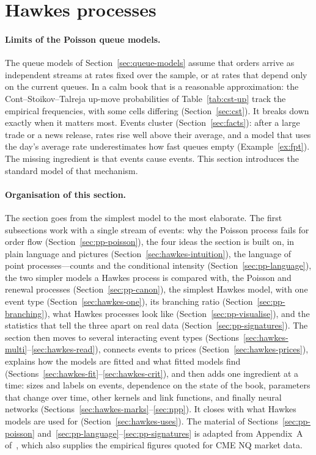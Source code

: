 \section{Hawkes processes}
\label{sec:hawkes}

\paragraph{Limits of the Poisson queue models.} The queue models of Section~\ref{sec:queue-models} assume
that orders arrive as independent streams at rates fixed over the sample, or at rates that depend only
on the current queues. In a calm book that is a
reasonable approximation: the Cont--Stoikov--Talreja up-move probabilities of Table~\ref{tab:cst-up}
track the empirical frequencies, with some cells differing (Section~\ref{sec:cst}). It breaks down
exactly when it matters most. Events cluster (Section~\ref{sec:facts}): after a large trade or a news
release, rates rise well above their average, and a model
that uses the day's average rate underestimates how fast queues empty (Example~\ref{ex:fpt}). The
missing ingredient is that events cause events. This section introduces the standard model of that
mechanism.

\paragraph{Organisation of this section.} The section goes from the simplest model to the most
elaborate. The first subsections work with a single stream of events: why the Poisson process fails
for order flow (Section~\ref{sec:pp-poisson}), the four ideas the section is built on, in plain language and
pictures (Section~\ref{sec:hawkes-intuition}), the language of point processes---counts and the conditional
intensity (Section~\ref{sec:pp-language}), the two simpler models a Hawkes process is compared with, the
Poisson and renewal processes (Section~\ref{sec:pp-canon}), the simplest Hawkes model, with one event type
(Section~\ref{sec:hawkes-one}), its branching ratio (Section~\ref{sec:pp-branching}), what Hawkes processes
look like (Section~\ref{sec:pp-visualise}), and the statistics that tell the three apart on real data
(Section~\ref{sec:pp-signatures}). The section then moves to several interacting event types
(Sections~\ref{sec:hawkes-multi}--\ref{sec:hawkes-read}), connects events to prices
(Section~\ref{sec:hawkes-prices}), explains how the models are fitted and what fitted models find
(Sections~\ref{sec:hawkes-fit}--\ref{sec:hawkes-crit}), and then adds one ingredient at a time: sizes and
labels on events, dependence on the state of the book, parameters that change over time, other kernels and link
functions, and finally neural networks (Sections~\ref{sec:hawkes-marks}--\ref{sec:npp}). It closes with what Hawkes models are used for
(Section~\ref{sec:hawkes-uses}). The material of Sections~\ref{sec:pp-poisson} and~\ref{sec:pp-language}--\ref{sec:pp-signatures} is adapted from Appendix~A
of~\citet{maciejewski2026packets}, which also supplies the empirical figures quoted for CME NQ market data.

